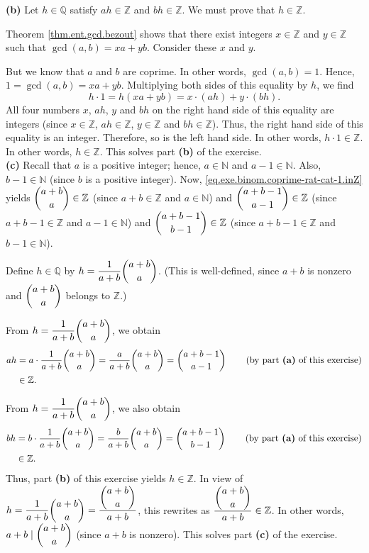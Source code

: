 \documentclass[paper=a4, fontsize=12pt]{scrartcl}%
\theoremstyle{plainsl}
\theoremstyle{definition}
\theoremstyle{remark}
\begin{document}
\textbf{(b)} Let $h\in\mathbb{Q}$ satisfy $ah\in\mathbb{Z}$ and $bh\in
\mathbb{Z}$. We must prove that $h\in\mathbb{Z}$.

Theorem \ref{thm.ent.gcd.bezout} shows that there exist integers
$x\in\mathbb{Z}$ and $y\in\mathbb{Z}$ such that $\gcd\left(  a,b\right)
=xa+yb$. Consider these $x$ and $y$.

But we know that $a$ and $b$ are coprime. In other words, $\gcd\left(
a,b\right)  =1$. Hence, $1=\gcd\left(  a,b\right)  =xa+yb$. Multiplying both
sides of this equality by $h$, we find%
\[
h\cdot1=h\left(  xa+yb\right)  =x\cdot\left(  ah\right)  +y\cdot\left(
bh\right)  .
\]
All four numbers $x$, $ah$, $y$ and $bh$ on the right hand side of this
equality are integers (since $x\in\mathbb{Z}$, $ah\in\mathbb{Z}$,
$y\in\mathbb{Z}$ and $bh\in\mathbb{Z}$). Thus, the right hand side of this
equality is an integer. Therefore, so is the left hand side. In other words,
$h\cdot1\in\mathbb{Z}$. In other words, $h\in\mathbb{Z}$. This solves part
\textbf{(b)} of the exercise. \\[0.4cm]

\textbf{(c)} Recall that $a$ is a positive integer; hence, $a\in\mathbb{N}$
and $a-1\in\mathbb{N}$. Also, $b-1\in\mathbb{N}$ (since $b$ is a positive
integer). Now, \eqref{eq.exe.binom.coprime-rat-cat-1.inZ} yields $\dbinom
{a+b}{a}\in\mathbb{Z}$ (since $a+b\in\mathbb{Z}$ and $a\in\mathbb{N}$) and
$\dbinom{a+b-1}{a-1}\in\mathbb{Z}$ (since $a+b-1\in\mathbb{Z}$ and
$a-1\in\mathbb{N}$) and $\dbinom{a+b-1}{b-1}\in\mathbb{Z}$ (since
$a+b-1\in\mathbb{Z}$ and $b-1\in\mathbb{N}$).

Define $h\in\mathbb{Q}$ by $h=\dfrac{1}{a+b}\dbinom{a+b}{a}$. (This is
well-defined, since $a+b$ is nonzero and $\dbinom{a+b}{a}$ belongs to
$\mathbb{Z}$.)

From $h=\dfrac{1}{a+b}\dbinom{a+b}{a}$, we obtain%
\begin{align*}
ah  &  =a\cdot\dfrac{1}{a+b}\dbinom{a+b}{a}=\dfrac{a}{a+b}\dbinom{a+b}%
{a}=\dbinom{a+b-1}{a-1}\qquad\left(  \text{by part \textbf{(a)} of this
exercise}\right) \\
&  \in\mathbb{Z}.
\end{align*}


From $h=\dfrac{1}{a+b}\dbinom{a+b}{a}$, we also obtain%
\begin{align*}
bh  &  =b\cdot\dfrac{1}{a+b}\dbinom{a+b}{a}=\dfrac{b}{a+b}\dbinom{a+b}%
{a}=\dbinom{a+b-1}{b-1}\qquad\left(  \text{by part \textbf{(a)} of this
exercise}\right) \\
&  \in\mathbb{Z}.
\end{align*}
Thus, part \textbf{(b)} of this exercise yields $h\in\mathbb{Z}$. In view of
$h=\dfrac{1}{a+b}\dbinom{a+b}{a}=\dfrac{\dbinom{a+b}{a}}{a+b}$, this rewrites
as $\dfrac{\dbinom{a+b}{a}}{a+b}\in\mathbb{Z}$. In other words, $a+b\mid
\dbinom{a+b}{a}$ (since $a+b$ is nonzero). This solves part \textbf{(c)} of
the exercise. \\[0.4cm]
\end{document}
